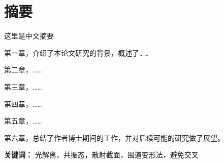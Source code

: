 \chapter{摘要}



这里是中文摘要

第一章，介绍了本论文研究的背景，概述了……


第二章，……


第三章，……


第四章，……


第五章，……


第六章，总结了作者博士期间的工作，并对后续可能的研究做了展望。



\textbf{关键词：} 光解离，共振态，散射截面，围道变形法，避免交叉
\clearpage
\thispagestyle{plain}



